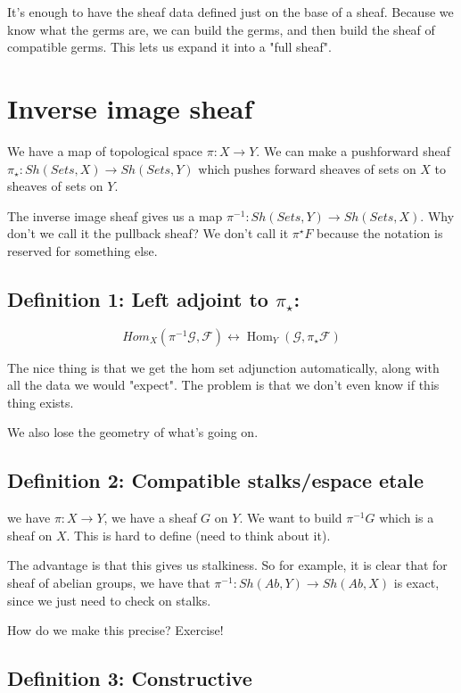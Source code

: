 \documentclass{book}
\newcommand{\Hom}{\operatorname{Hom}}
\newcommand{\F}{\ensuremath{\mathcal{F}}}
\newcommand{\G}{\ensuremath{\mathcal{G}}}
\newcommand{\inv}{\ensuremath{-1}}
\newcommand{\piinv}{\ensuremath{\pi^\inv}}
\theoremstyle{definition}
\begin{document}
It's enough to have the sheaf data defined just on the base of a sheaf.
Because we know what the germs are, we can build the germs, and then
build the sheaf of compatible germs. This lets us expand it into
a "full sheaf".

\section{Inverse image sheaf}

We have a map of topological space $\pi: X \rightarrow Y$. We can make a pushforward
sheaf $\pi_\star: Sh(Sets, X) \rightarrow Sh(Sets, Y)$ which pushes forward
sheaves of sets on $X$ to sheaves of sets on $Y$.

The inverse image sheaf gives us a map $\pi^{-1}: Sh(Sets, Y) \rightarrow Sh(Sets, X)$.
Why don't we call it the pullback sheaf?  We don't call it $\pi^\star F$ because
the notation is reserved for something else.


\subsection{Definition 1: Left adjoint to $\pi_\star$:}

$$Hom_X(\piinv \G, \F) \leftrightarrow \Hom_Y(\G, \pi_\star \F)$$

The nice thing is that we get the hom set adjunction automatically, along
with all the data we would "expect". The problem is that we don't even know
if this thing exists.

We also lose the geometry of what's going on.


\subsection{Definition 2: Compatible stalks/espace etale}

we have $\pi: X \rightarrow Y$, we have a sheaf $G$ on $Y$. We want to build
$\piinv G$ which is a sheaf on $X$. This is hard to define (need to think about it).


The advantage is that this gives us stalkiness. So for example, it is  clear that
for  sheaf of abelian groups, we have that $\piinv: Sh(Ab, Y) \rightarrow Sh(Ab, X)$
is exact, since we just need to check on stalks.


How do we make this precise? Exercise!

\subsection{Definition 3: Constructive}
\end{document}

